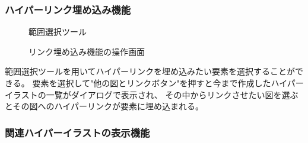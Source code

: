 \subsubsection{ハイパーリンク埋め込み機能}

\begin{figure}[H] \begin{minipage}{0.5\hsize}
                         \begin{center} 
                         \end{center} \caption{範囲選択ツール} \label{fig:addLink1}
\end{minipage} \begin{minipage}{0.5\hsize}
                   \begin{center} 
                   \end{center} \caption{リンク埋め込み機能の操作画面} \label{fig:addLink2}
\end{minipage}
\end{figure}

範囲選択ツールを用いてハイパーリンクを埋め込みたい要素を選択することができる。
要素を選択して"他の図とリンクボタン"を押すと今まで作成したハイパーイラストの一覧がダイアログで表示され、
その中からリンクさせたい図を選ぶとその図へのハイパーリンクが要素に埋め込まれる。

\subsubsection{関連ハイパーイラストの表示機能}

